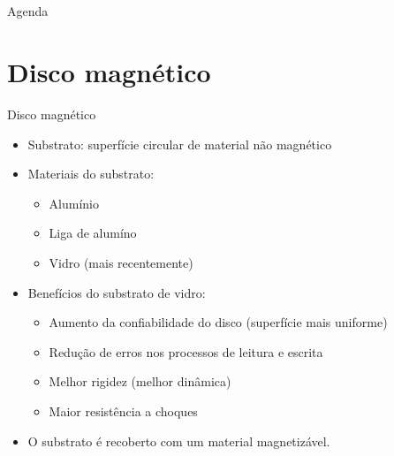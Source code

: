 



\title{\cursogrande\\ \vspace{1cm}{Memória externa}}


\maketitle[randomdots={false}]

\begin{slide}{Agenda}
      \tableofcontents[content=sections]
   \end{slide}

\section[slide=true]{Disco magnético}
\begin{slide}{Disco magnético}
	\begin{itemize}
		\item Substrato: superfície circular de material não magnético
		\item Materiais do substrato: 
			\begin{itemize}
				\item Alumínio
				\item Liga de alumíno
				\item Vidro (mais recentemente)
			\end{itemize}
		\item Benefícios do substrato de vidro:
			\begin{itemize}
				\item Aumento da confiabilidade do disco (superfície mais uniforme)
				\item Redução de erros nos processos de leitura e escrita
				\item Melhor rigidez (melhor dinâmica)
				\item Maior resistência a choques
			\end{itemize}
		\item O substrato é recoberto com um material magnetizável.
	\end{itemize}
\end{slide}

